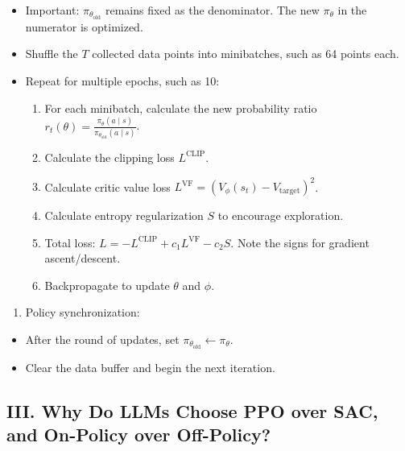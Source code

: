 \begin{itemize}
\tightlist
\item
  Important: \(\pi_{\theta_{\mathrm{old}}}\) remains fixed as the denominator. The new \(\pi_\theta\) in the numerator is optimized.
\item
  Shuffle the \(T\) collected data points into minibatches, such as 64 points each.
\item
{}
  Repeat for multiple epochs, such as 10:

  \begin{enumerate}
  \def\labelenumi{\arabic{enumi}.}
  \tightlist
  \item
    For each minibatch, calculate the new probability ratio \(r_t(\theta)=\frac{\pi_\theta(a \mid s)}{\pi_{\theta_{\mathrm{old}}}(a \mid s)}\).
  \item
    Calculate the clipping loss \(L^{\mathrm{CLIP}}\).
  \item
    Calculate critic value loss \(L^{\mathrm{VF}} = (V_\phi(s_t) - V_{\mathrm{target}})^2\).
  \item
    Calculate entropy regularization \(S\) to encourage exploration.
  \item
    Total loss: \(L = -L^{\mathrm{CLIP}} + c_1 L^{\mathrm{VF}} - c_2 S\). Note the signs for gradient ascent/descent.
  \item
    Backpropagate to update \(\theta\) and \(\phi\).
  \end{enumerate}
\end{itemize}

\begin{enumerate}
\def\labelenumi{\arabic{enumi}.}
\setcounter{enumi}{3}
\tightlist
\item
{}
  Policy synchronization:
\end{enumerate}

\begin{itemize}
\tightlist
\item
  After the round of updates, set \(\pi_{\theta_{\mathrm{old}}} \leftarrow \pi_\theta\).
\item
  Clear the data buffer and begin the next iteration.
\end{itemize}

\hypertarget{iii.-why-do-llms-choose-ppo-over-sac-and-on-policy-over-off-policy}{%
\subsection{III. Why Do LLMs Choose PPO over SAC, and On-Policy over Off-Policy?}\label{iii.-why-do-llms-choose-ppo-over-sac-and-on-policy-over-off-policy}}

